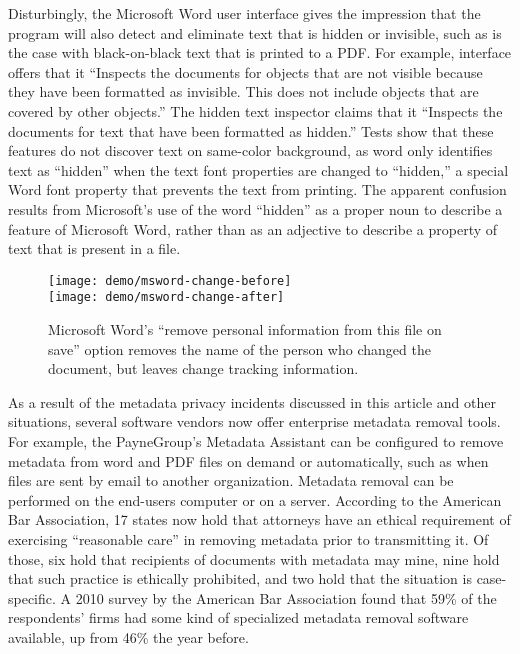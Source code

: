 Disturbingly, the Microsoft Word user interface gives the impression
that the program will also detect and eliminate text that is hidden or
invisible, such as is the case with black-on-black text that is
printed to a PDF. For example, interface offers that it 
``Inspects the documents for objects that are not visible because they
have been formatted as invisible. This does not include objects that
are covered by other objects.'' The hidden text inspector claims that
it ``Inspects the documents for text that have been formatted as
hidden.''  Tests show that these features do
not discover text on same-color background, as word only identifies text as ``hidden'' when the
text font properties are changed to ``hidden,'' a special Word font
property that prevents the text from printing. The apparent confusion results
from Microsoft's use of the word ``hidden'' as a proper noun to
describe a feature of Microsoft Word, rather than as an adjective to
describe a property of text that is present in a file.

\begin{figure}
\texttt{[image: demo/msword-change-before]}\\
\texttt{[image: demo/msword-change-after]}\\
\caption{Microsoft Word's ``remove personal information from this file
  on save'' option removes the name of the person who changed the
  document, but leaves change tracking information.}\label{msword-remove-demo}
\end{figure}

As a result of the metadata privacy incidents discussed in this
article and other situations, several software vendors now offer
enterprise metadata removal tools. For example, the PayneGroup's
Metadata Assistant can be configured to remove metadata from word and
PDF files on demand or automatically, such as when files are sent by
email to another organization. Metadata removal can be performed on
the end-users computer or on a server. According to the American Bar
Association, 17 states now hold that attorneys have an ethical
requirement of exercising ``reasonable care'' in removing metadata
prior to transmitting it\cite{aba-survey}. Of those, six hold that
recipients of documents with metadata may mine, nine hold that such
practice is ethically prohibited, and two hold that the situation is
case-specific. A 2010 survey by the American Bar Association found
that 59\% of the respondents' firms had some kind of specialized
metadata removal software available, up from 46\% the year before.


